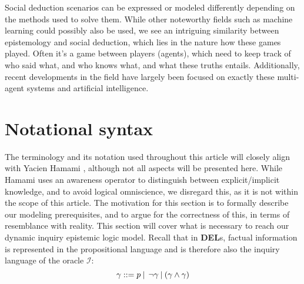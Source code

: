 Social deduction scenarios can be expressed or modeled differently depending on the methods used to solve them. While other noteworthy fields such as machine learning could possibly also be used, we see an intriguing similarity between epistemology and social deduction, which lies in the nature how these games played. Often it's a game between players (agents), which need to keep track of who said what, and who knows what, and what these truths entails. Additionally, recent developments in the field have largely been focused on exactly these multi-agent systems and artificial intelligence. 

\section{Notational syntax}
The terminology and its notation used throughout this article will closely
align with Yacien Hamami \cite{delimi}, although not all aspects will be
presented here. While Hamami uses an awareness operator to distinguish between explicit/implicit knowledge, and to avoid logical omniscience, we disregard this, as it is not within the scope of this article. \newline
The motivation for this section is to formally describe our
modeling prerequisites, and to argue for the correctness of this, in terms of
resemblance with reality. This section will cover what is necessary to reach
our dynamic inquiry epistemic logic model. Recall that in \textbf{DEL}s,
factual information is represented in the propositional language and is
therefore also the inquiry language of the oracle $\mathscr{I}$: $$ \gamma::= p
	\:|\:\:\neg\gamma\:|\:(\gamma\land\gamma) $$

